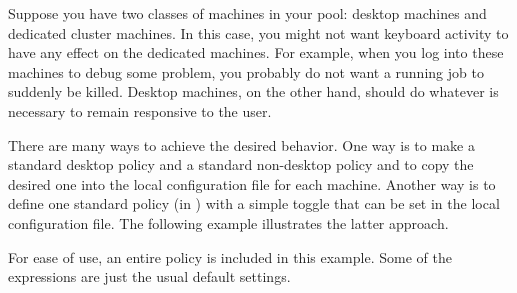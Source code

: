 Suppose you have two classes of machines in your pool: desktop
machines and dedicated cluster machines.  In this case, you might not
want keyboard activity to have any effect on the dedicated machines.
For example, when you log into these machines to debug some problem,
you probably do not want a running job to suddenly be killed.  Desktop
machines, on the other hand, should do whatever is necessary to remain
responsive to the user.

There are many ways to achieve the desired behavior.  One way is to
make a standard desktop policy and a standard non-desktop policy and
to copy the desired one into the local configuration file for each
machine.  Another way is to define one standard policy (in
) with a simple toggle that can be set in the local
configuration file.  The following example illustrates the latter
approach.

For ease of use, an entire policy is included in this example.  Some of the
expressions are just the usual default settings.

